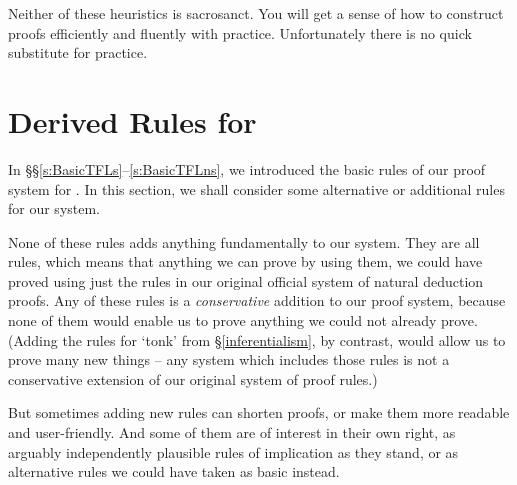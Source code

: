 Neither of these heuristics is sacrosanct. You will get a sense of how to construct proofs efficiently and fluently with practice. Unfortunately there is no quick substitute for practice.








\chapter{Derived Rules for \textnormal{\TFL}}\label{s:Derived}
In §§\ref{s:BasicTFLs}–\ref{s:BasicTFLns}, we introduced the basic rules of our proof system for \TFL. In this section, we shall consider some alternative or additional rules for our system.

None of these rules adds anything fundamentally to our system. They are all  rules, which means that anything we can prove by using them, we could have proved using just the rules in our original official system of natural deduction proofs. Any of these rules is a \emph{conservative} addition to our proof system, because none of them would enable us to prove anything we could not already prove. (Adding the rules for `tonk' from §\ref{inferentialism}, by contrast, would allow us to prove many new things – any system which includes those rules is not a conservative extension of our original system of proof rules.)

 But sometimes adding new rules can shorten proofs, or make them more readable and user-friendly. And some of them are of interest in their own right, as arguably independently plausible rules of implication as they stand, or as alternative rules we could have taken as basic instead.

